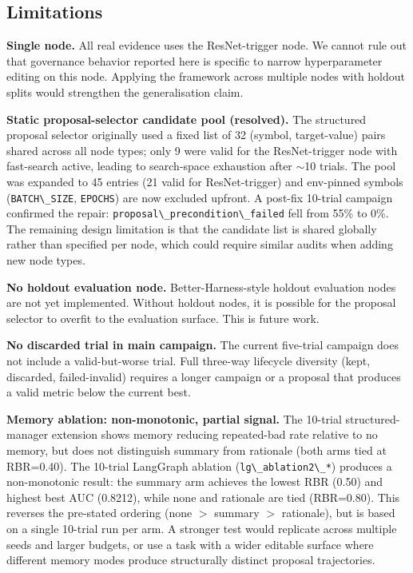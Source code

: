 \subsection{Limitations}\label{limitations}

\textbf{Single node.} All real evidence uses the ResNet-trigger node. We cannot rule out that governance behavior reported here is specific to narrow hyperparameter editing on this node. Applying the framework across multiple nodes with holdout splits would strengthen the generalisation claim.

\textbf{Static proposal-selector candidate pool (resolved).} The structured proposal selector originally used a fixed list of 32 (symbol, target-value) pairs shared across all node types; only 9 were valid for the ResNet-trigger node with fast-search active, leading to search-space exhaustion after $\sim$10 trials. The pool was expanded to 45 entries (21 valid for ResNet-trigger) and env-pinned symbols (\passthrough{\lstinline!BATCH\_SIZE!}, \passthrough{\lstinline!EPOCHS!}) are now excluded upfront. A post-fix 10-trial campaign confirmed the repair: \passthrough{\lstinline!proposal\_precondition\_failed!} fell from 55\% to 0\%. The remaining design limitation is that the candidate list is shared globally rather than specified per node, which could require similar audits when adding new node types.

\textbf{No holdout evaluation node.} Better-Harness-style holdout evaluation nodes are not yet implemented. Without holdout nodes, it is possible for the proposal selector to overfit to the evaluation surface. This is future work.

\textbf{No discarded trial in main campaign.} The current five-trial campaign does not include a valid-but-worse trial. Full three-way lifecycle diversity (kept, discarded, failed-invalid) requires a longer campaign or a proposal that produces a valid metric below the current best.

\textbf{Memory ablation: non-monotonic, partial signal.} The 10-trial structured-manager extension shows memory reducing repeated-bad rate relative to no memory, but does not distinguish summary from rationale (both arms tied at RBR=0.40). The 10-trial LangGraph ablation (\passthrough{\lstinline!lg\_ablation2\_*!}) produces a non-monotonic result: the summary arm achieves the lowest RBR (0.50) and highest best AUC (0.8212), while none and rationale are tied (RBR=0.80). This reverses the pre-stated ordering (none $>$ summary $>$ rationale), but is based on a single 10-trial run per arm. A stronger test would replicate across multiple seeds and larger budgets, or use a task with a wider editable surface where different memory modes produce structurally distinct proposal trajectories.

